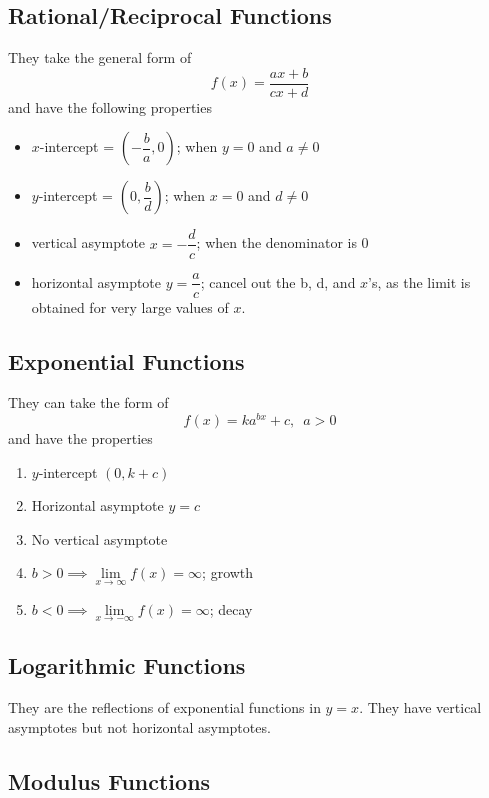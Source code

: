 \documentclass[11pt]{article}
\begin{document}
\subsection{Rational/Reciprocal Functions}

They take the general form of $$f(x) = \frac{ax + b}{cx + d}$$ and have the following properties
\begin{itemize}
  \item $x$-intercept = $(-\dfrac{b}{a}, 0)$; when $y = 0$ and $a\not = 0$
  \item $y$-intercept = $(0, \dfrac{b}{d})$; when $x = 0$ and $d\not = 0$
  \item vertical asymptote $x = -\dfrac{d}{c}$; when the denominator is 0
  \item horizontal asymptote $y = \dfrac{a}{c}$; cancel out the b, d, and $x$'s, as the limit is obtained for very large values of $x$.
\end{itemize}

\pagebreak

\subsection{Exponential Functions}

They can take the form of $$f(x)=ka^{bx} + c,\,\,\, a > 0$$ and have the properties
\begin{enumerate}
  \item $y$-intercept $(0, k + c)$
  \item Horizontal asymptote $y = c$
  \item No vertical asymptote
  \item $b > 0 \implies \lim\limits_{x\to\infty}f(x) = \infty$; growth
  \item $b < 0 \implies \lim\limits_{x\to-\infty}f(x) = \infty$; decay
\end{enumerate}


\subsection{Logarithmic Functions}

They are the reflections of exponential functions in $y = x$. They have vertical asymptotes but not horizontal asymptotes.

\pagebreak

\subsection{Modulus Functions}
\end{document}
